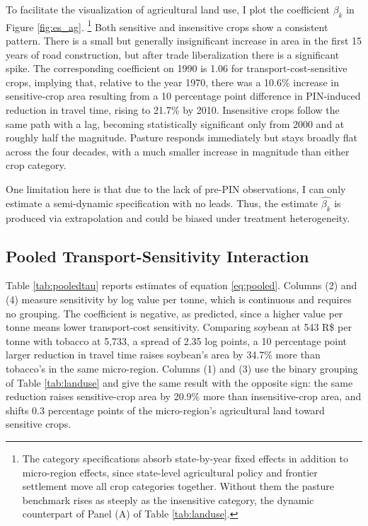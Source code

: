 \documentclass[11pt]{article}
\begin{document}
To facilitate the visualization of agricultural land use, I plot the coefficient $\beta_k$ in Figure \ref{fig:es_ag}. \footnote{The category specifications absorb state-by-year fixed effects in addition to micro-region effects, since state-level agricultural policy and frontier settlement move all crop categories together. Without them the pasture benchmark rises as steeply as the insensitive category, the dynamic counterpart of Panel (A) of Table \ref{tab:landuse}.} Both sensitive and insensitive crops show a consistent pattern. There is a small but generally insignificant increase in area in the first 15 years of road construction, but after trade liberalization there is a significant spike. The corresponding coefficient on 1990 is 1.06 for transport-cost-sensitive crops, implying that, relative to the year 1970, there was a 10.6\% increase in sensitive-crop area resulting from a 10 percentage point difference in PIN-induced reduction in travel time, rising to 21.7\% by 2010. Insensitive crops follow the same path with a lag, becoming statistically significant only from 2000 and at roughly half the magnitude. Pasture responds immediately but stays broadly flat across the four decades, with a much smaller increase in magnitude than either crop category.

One limitation here is that due to the lack of pre-PIN observations, I can only estimate a semi-dynamic specification with no leads. Thus, the estimate $\hat{\beta_k}$ is produced via extrapolation and could be biased under treatment heterogeneity. 

\subsection{Pooled Transport-Sensitivity Interaction}
\label{sec:pooled}

Table \ref{tab:pooledtau} reports estimates of equation \eqref{eq:pooled}. Columns (2) and (4) measure sensitivity by log value per tonne, which is continuous and requires no grouping. The coefficient is negative, as predicted, since a higher value per tonne means lower transport-cost sensitivity. Comparing soybean at 543 R\$ per tonne with tobacco at 5,733, a spread of 2.35 log points, a 10 percentage point larger reduction in travel time raises soybean's area by 34.7\% more than tobacco's in the same micro-region. Columns (1) and (3) use the binary grouping of Table \ref{tab:landuse} and give the same result with the opposite sign: the same reduction raises sensitive-crop area by 20.9\% more than insensitive-crop area, and shifts 0.3 percentage points of the micro-region's agricultural land toward sensitive crops.
\end{document}
